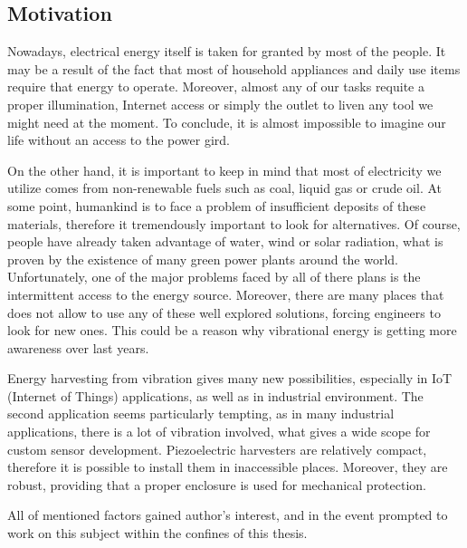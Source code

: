 \documentclass[12pt,a4paper]{article}
\begin{document}
\subsection{Motivation}
Nowadays, electrical energy itself is taken for granted by most of the people. It may be a result of the fact that most of household appliances and daily use items require that energy to operate. Moreover, almost any of our tasks requite a proper illumination, Internet access or simply the outlet to liven any tool we might need at the moment. To conclude, it is almost impossible to imagine our life without an access to the power gird.
\par
On the other hand, it is important to keep in mind that most of electricity we utilize comes from non-renewable fuels such as coal, liquid gas or crude oil. At some point, humankind is to face a problem of insufficient deposits of these materials, therefore it tremendously important to look for alternatives. Of course, people have already taken advantage of water, wind or solar radiation, what is proven by the existence of many green power plants around the world. Unfortunately, one of the major problems faced by all of there plans is the intermittent access to the energy source. Moreover, there are many places that does not allow to use any of these well explored solutions, forcing engineers to look for new ones. This could be a reason why vibrational energy is getting more awareness over last years.
\par

Energy harvesting from vibration gives many new possibilities, especially in IoT (Internet of Things) applications, as well as in industrial environment. The second application seems particularly tempting, as in many industrial applications, there is a lot of vibration involved, what gives a wide scope for custom sensor development. Piezoelectric harvesters are relatively compact, therefore it is possible to install them in inaccessible places. Moreover, they are robust, providing that a proper enclosure is used for mechanical protection.
\par

All of mentioned factors gained author's interest, and in the event prompted to work on this subject within the confines of this thesis.
\par
\end{document}
